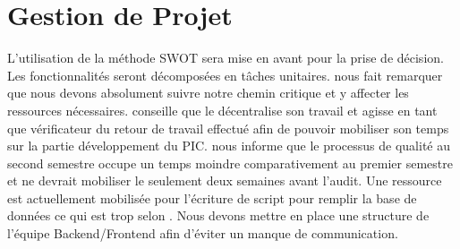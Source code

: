 \documentclass [a4paper] {article}
\begin{document}
\section{Gestion de Projet}
L'utilisation de la méthode SWOT sera mise en avant pour la prise de décision. Les fonctionnalités seront décomposées en tâches unitaires.
\nomTuteurPedago{} nous fait remarquer que nous devons absolument suivre notre chemin critique et y affecter les ressources nécessaires.
\nomTuteurPedago{} conseille que le \RQ{} décentralise son travail et agisse en tant que vérificateur du retour de travail effectué afin de pouvoir mobiliser son temps sur la partie développement du PIC.
\nomTuteurPedago{} nous informe que le processus de qualité au second semestre occupe un temps moindre comparativement au premier semestre et ne devrait mobiliser le \RQ{} seulement deux semaines avant l'audit. Une ressource est actuellement mobilisée pour l'écriture de script pour remplir la base de données ce qui est trop selon \nomTuteurPedago. Nous devons mettre en place une structure de l'équipe Backend/Frontend afin d'éviter un manque de communication.


\newpage
\end{document}
